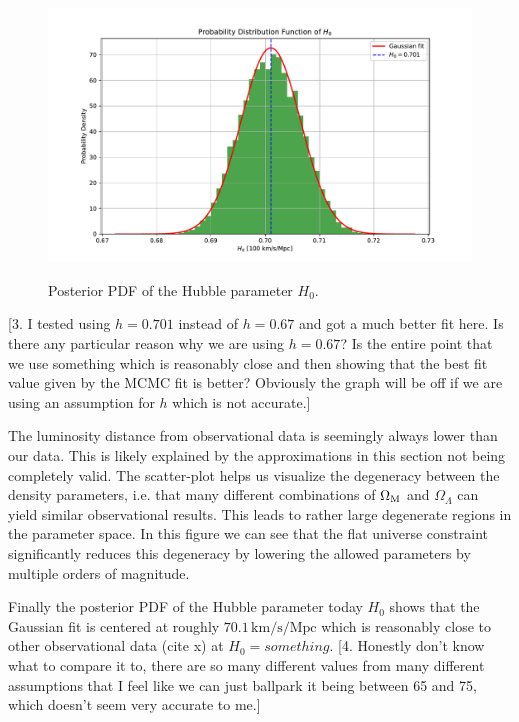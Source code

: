 \documentclass[%
reprint,
 amsmath,amssymb,
 aps,
]{revtex4-2}
\begin{document}
\begin{figure}
\caption{Posterior PDF of the Hubble parameter $H_0$.}
\includegraphics[width = \linewidth]{Figures/PDEh.pdf}
\label{PDEh}
\end{figure}

\color{red}[3. I tested using $h=0.701$ instead of $h=0.67$ and got a much better fit here. Is there any particular reason why we are using $h=0.67$? Is the entire point that we use something which is reasonably close and then showing that the best fit value given by the MCMC fit is better? Obviously the graph will be off if we are using an assumption for $h$ which is not accurate.]\color{black}

The luminosity distance from observational data is seemingly always lower than our data. This is likely explained by the approximations in this section not being completely valid. The scatter-plot helps us visualize the degeneracy between the density parameters, i.e. that many different combinations of $\Omega_\text M$ and $\Omega_{\Lambda}$ can yield similar observational results. This leads to rather large degenerate regions in the parameter space. In this figure we can see that the flat universe constraint significantly reduces this degeneracy by lowering the allowed parameters by multiple orders of magnitude.

Finally the posterior PDF of the Hubble parameter today $H_0$ shows that the Gaussian fit is centered at roughly $70.1\,\text{km/s/Mpc}$ which is reasonably close to other observational data (cite x) at $H_0=something$. \color{red}[4. Honestly don't know what to compare it to, there are so many different values from many different assumptions that I feel like we can just ballpark it being between 65 and 75, which doesn't seem very accurate to me.]\color{black}
\end{document}
